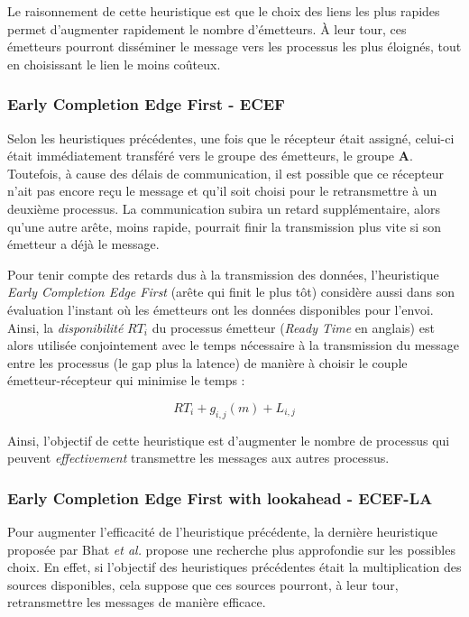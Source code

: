 Le raisonnement de cette heuristique est que le choix des liens les
plus rapides permet d'augmenter rapidement le nombre d'émetteurs.
À leur tour, ces émetteurs pourront disséminer le message vers les
processus les plus éloignés, tout en choisissant le lien le moins
coûteux.


\subsubsection*{Early Completion Edge First - ECEF}

Selon les heuristiques précédentes, une fois que le récepteur était
assigné, celui-ci était immédiatement transféré vers le groupe des
émetteurs, le groupe \textbf{A}. Toutefois, à cause des délais de
communication, il est possible que ce récepteur n'ait pas encore reçu
le message et qu'il soit choisi pour le retransmettre à un deuxième
processus. La communication subira un retard supplémentaire, alors
qu'une autre arête, moins rapide, pourrait finir la transmission plus
vite si son émetteur a déjà le message. 

Pour tenir compte des retards dus à la transmission des données, l'heuristique
\emph{Early Completion Edge First} (arête qui finit le plus tôt) considère
aussi dans son évaluation l'instant où les émetteurs ont les données
disponibles pour l'envoi. Ainsi, la \emph{disponibilité} $RT_{i}$
du processus émetteur (\emph{Ready Time} en anglais) est alors utilisée
conjointement avec le temps nécessaire à la transmission du message
entre les processus (le gap plus la latence) de manière à choisir
le couple émetteur-récepteur qui minimise le temps : 

\[
RT_{i}+g_{i,j}(m)+L_{i,j}\]


Ainsi, l'objectif de cette heuristique est d'augmenter le nombre de
processus qui peuvent \emph{effectivement} transmettre les messages
aux autres processus.


\subsubsection*{Early Completion Edge First with lookahead - ECEF-LA}

Pour augmenter l'efficacité de l'heuristique précédente, la dernière
heuristique proposée par Bhat \emph{et al.} \cite{Bhat03} propose
une recherche plus approfondie sur les possibles choix. En effet,
si l'objectif des heuristiques précédentes était la multiplication
des sources disponibles, cela suppose que ces sources pourront, à
leur tour, retransmettre les messages de manière efficace.

